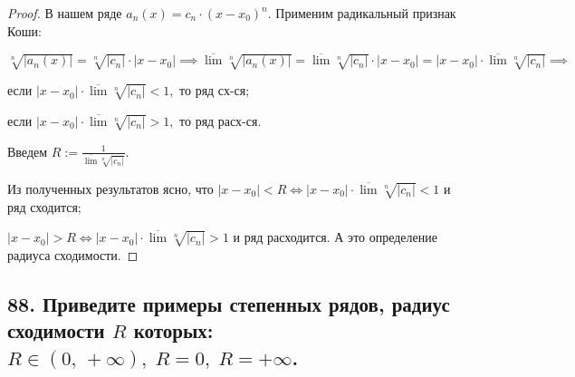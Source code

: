 \documentclass[a4paper, fleqn]{article}
\begin{document}
        \begin{proof} 
        В нашем ряде $a_n(x) = c_n \cdot (x - x_0)^n.$ Применим радикальный признак Коши: 
        
        $\sqrt[n]{|a_n(x)|} = \sqrt[n]{|c_n|} \cdot |x - x_0| \implies
        \overline{\lim} \sqrt[n]{|a_n(x)|} = \overline{\lim} \sqrt[n]{|c_n|} \cdot |x - x_0| =
        |x - x_0| \cdot \overline{\lim} \sqrt[n]{|c_n|} \implies $ 
        
        если $|x - x_0| \cdot \overline{\lim} \sqrt[n]{|c_n|} < 1,$ то ряд сх-ся;
        
        если $|x - x_0| \cdot \overline{\lim} \sqrt[n]{|c_n|} > 1,$ то ряд расх-ся.
        
        Введем $R := \frac{1}{\overline{\lim} \sqrt[n]{|c_n|}}.$
        
        Из полученных результатов ясно, что $|x - x_0| < R \iff |x - x_0| \cdot \overline{\lim} \sqrt[n]{|c_n|} < 1$ и ряд сходится; 
        
        $|x - x_0| > R \iff |x - x_0| \cdot \overline{\lim} \sqrt[n]{|c_n|} > 1$ и ряд расходится. А это определение радиуса сходимости.
        
        \end{proof}
        
    \subsection*{88. Приведите примеры степенных рядов, радиус сходимости $R$ которых: $R \in (0, \, +\infty), \; R = 0, \; R = +\infty$.}
\end{document}
